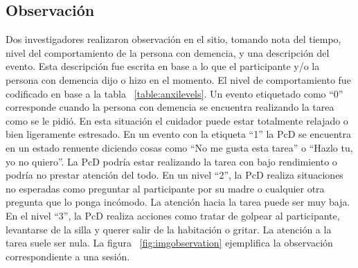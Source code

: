 	\subsection{Observaci\'on}
	Dos investigadores realizaron observaci\'on en el sitio, tomando nota del tiempo, nivel del comportamiento de la persona con demencia, y una descripci\'on del evento. Esta descripci\'on fue escrita en base a lo que el participante y/o la persona con demencia dijo o hizo en el momento. El nivel de comportamiento fue codificado en base a la tabla ~\ref{table:anxilevels}. Un evento etiquetado como ``0'' corresponde cuando la persona con demencia se encuentra realizando la tarea como se le pidi\'o. En esta situaci\'on el cuidador puede estar totalmente relajado o bien ligeramente estresado. En un evento con la etiqueta ``1'' la PcD se encuentra en un estado renuente diciendo cosas como ``No me gusta esta tarea'' o ``Hazlo tu, yo no quiero''. La PcD podr\'ia estar realizando la tarea con bajo rendimiento o podr\'ia no prestar atenci\'on del todo. En un nivel ``2'', la PcD realiza situaciones no esperadas como preguntar al participante por su madre o cualquier otra pregunta que lo ponga inc\'omodo. La atenci\'on hacia la tarea puede ser muy baja. En el nivel ``3'', la PcD realiza acciones como tratar de golpear al participante, levantarse de la silla y querer salir de la habitaci\'on o gritar. La atenci\'on a la tarea suele ser nula. La figura ~\ref{fig:imgobservation} ejemplifica la observaci\'on correspondiente a una sesi\'on.

